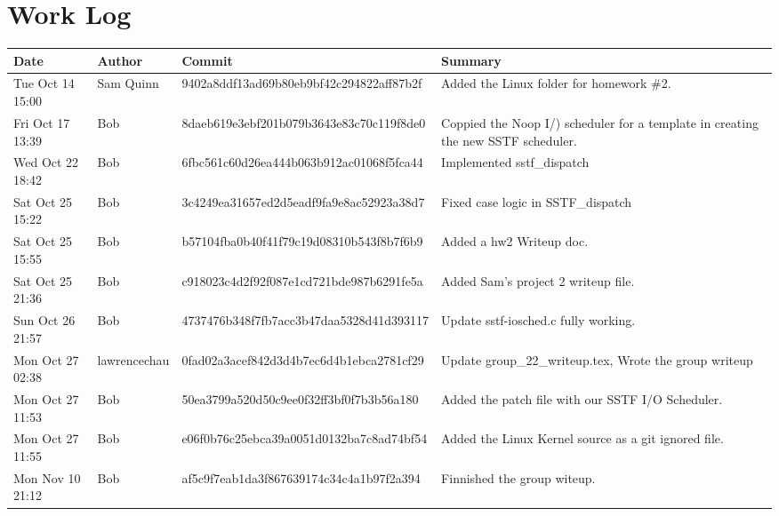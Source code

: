 \documentclass[letterpaper,10pt,notitlepage,fleqn]{article}
\begin{document}
\section*{Work Log}

\begin{center}
    \begin{tabular}{| p{3cm} | l | l | p{5cm} |}
        \hline
        Date & Author & Commit & Summary \\ \hline
        Tue Oct 14 15:00 & Sam Quinn & 9402a8ddf13ad69b80eb9bf42c294822aff87b2f & Added the Linux folder for homework \#2.
        \\ \hline
        Fri Oct 17 13:39 & Bob & 8daeb619e3ebf201b079b3643e83c70c119f8de0 & Coppied the Noop I/) scheduler for a template in creating the new SSTF scheduler.
        \\ \hline
        Wed Oct 22 18:42 & Bob & 6fbc561c60d26ea444b063b912ac01068f5fca44 & Implemented sstf\_dispatch
        \\ \hline
        Sat Oct 25 15:22 & Bob & 3c4249ea31657ed2d5eadf9fa9e8ac52923a38d7 & Fixed case logic in SSTF\_dispatch
        \\ \hline
        Sat Oct 25 15:55 & Bob & b57104fba0b40f41f79c19d08310b543f8b7f6b9 & Added a hw2 Writeup doc.
        \\ \hline
        Sat Oct 25 21:36 & Bob & c918023c4d2f92f087e1cd721bde987b6291fe5a & Added Sam's project 2 writeup file.
        \\ \hline
        Sun Oct 26 21:57 & Bob & 4737476b348f7fb7acc3b47daa5328d41d393117 & Update sstf-iosched.c fully working.
        \\ \hline
        Mon Oct 27 02:38 & lawrencechau & 0fad02a3acef842d3d4b7ec6d4b1ebca2781cf29 & Update group\_22\_writeup.tex, Wrote the group writeup
        \\ \hline
        Mon Oct 27 11:53 & Bob & 50ea3799a520d50c9ee0f32ff3bf0f7b3b56a180 & Added the patch file with our SSTF I/O Scheduler.
        \\ \hline
        Mon Oct 27 11:55 & Bob & e06f0b76c25ebca39a0051d0132ba7c8ad74bf54 & Added the Linux Kernel source as a git ignored file.
        \\ \hline
        Mon Nov 10 21:12 & Bob & af5c9f7eab1da3f867639174c34c4a1b97f2a394 & Finnished the group witeup.
        \\ \hline
    \end{tabular}
\end{center}
\end{document}
